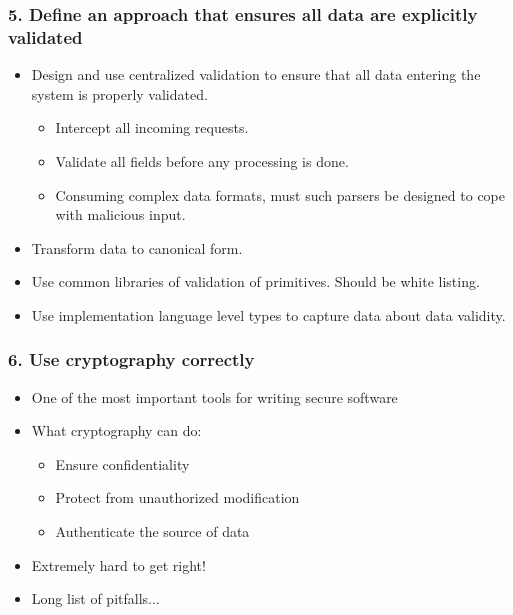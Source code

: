 \documentclass[12pt,norsk]{beamer}
\begin{document}
\begin{frame}

	\frametitle{5. Define an approach that ensures all data are explicitly validated}
	
	\begin{itemize}
		\item Design and use centralized validation to ensure that all data entering the system is properly validated. 
		\begin{itemize}
			\item Intercept all incoming requests.
			\item Validate all fields before any processing is done.
			\item Consuming complex data formats, must such parsers be designed to cope with malicious input.

		\end{itemize}

		\item Transform data to canonical form.
		\item Use common libraries of validation of primitives. Should be white listing. 
		\item Use implementation language level types to capture data about data validity. 				
	
	\end{itemize}
	

\end{frame}

\begin{frame}

	\frametitle{6. Use cryptography correctly}

	\begin{itemize}
		
		\item One of the most important tools for writing secure software
		\item What cryptography can do:
	
		\begin{itemize}
	
			\item Ensure confidentiality	
			\item Protect from unauthorized modification
			\item Authenticate the source of data
		\end{itemize}	 
	
		\item Extremely hard to get right!
		\item Long list of pitfalls...	
	
	\end{itemize}

\end{frame}
\end{document}
